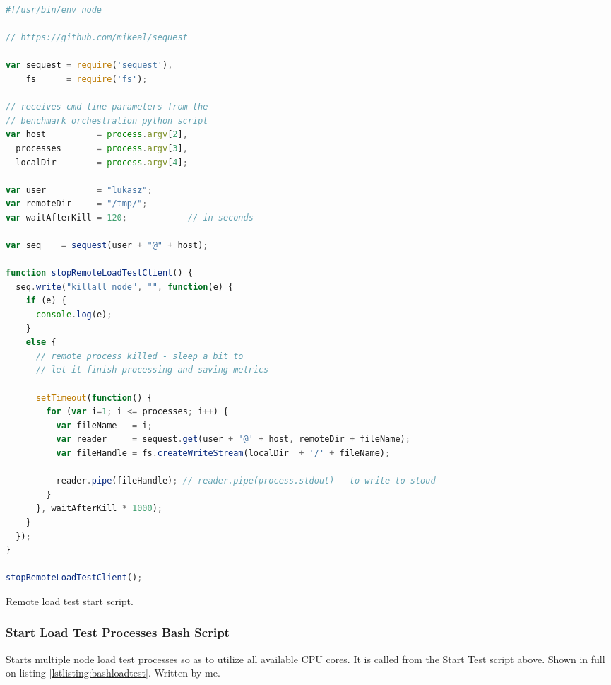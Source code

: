 \documentclass{uvamscse}
\begin{document}
\begin{sourcecode}[H]
\begin{lstlisting}[language=javascript]
#!/usr/bin/env node

// https://github.com/mikeal/sequest

var sequest = require('sequest'),
    fs      = require('fs');

// receives cmd line parameters from the
// benchmark orchestration python script
var host          = process.argv[2],
  processes       = process.argv[3],
  localDir        = process.argv[4];

var user          = "lukasz";
var remoteDir     = "/tmp/";
var waitAfterKill = 120;            // in seconds

var seq    = sequest(user + "@" + host);

function stopRemoteLoadTestClient() {
  seq.write("killall node", "", function(e) {
    if (e) {
      console.log(e);
    }
    else {
      // remote process killed - sleep a bit to
      // let it finish processing and saving metrics

      setTimeout(function() {
        for (var i=1; i <= processes; i++) {
          var fileName   = i;
          var reader     = sequest.get(user + '@' + host, remoteDir + fileName);
          var fileHandle = fs.createWriteStream(localDir  + '/' + fileName);

          reader.pipe(fileHandle); // reader.pipe(process.stdout) - to write to stoud
        }
      }, waitAfterKill * 1000);
    }
  });
}

stopRemoteLoadTestClient();

\end{lstlisting}
\caption{Remote load test start script.}
\label{lstlisting:remotestop}
\end{sourcecode}

\subsubsection{Start Load Test Processes Bash Script}
Starts multiple node load test processes so as to utilize all available CPU cores. It is called from the Start Test script above. Shown in full on listing \ref{lstlisting:bashloadtest}. Written by me.
\end{document}
